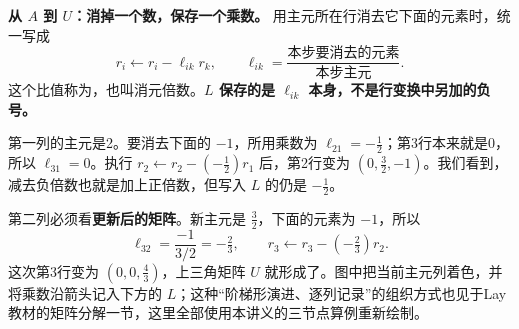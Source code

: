 \documentclass[a4paper,12pt,twoside,openany,fontset=none]{ctexbook}
\numberwithin{equation}{chapter}
\begin{document}
\par\medskip\noindent\textbf{从 $A$ 到 $U$：消掉一个数，保存一个乘数。}
用主元所在行消去它下面的元素时，统一写成
\[
 r_i\leftarrow r_i-\ell_{ik}r_k,\qquad
 \ell_{ik}=\frac{\text{本步要消去的元素}}{\text{本步主元}}.
\]
这个比值称为，也叫消元倍数。\textbf{$L$ 保存的是 $\ell_{ik}$ 本身，不是行变换中另加的负号。}

第一列的主元是2。要消去下面的 $-1$，所用乘数为 $\ell_{21}=\boxed{-\tfrac12}$；第3行本来就是0，所以 $\ell_{31}=\boxed{0}$。执行 $r_2\leftarrow r_2-(-\tfrac12)r_1$ 后，第2行变为 $(0,\tfrac32,-1)$。我们看到，减去负倍数也就是加上正倍数，但写入 $L$ 的仍是 $-\tfrac12$。

第二列必须看\textbf{更新后的矩阵}。新主元是 $\tfrac32$，下面的元素为 $-1$，所以
\[
 \ell_{32}=\frac{-1}{3/2}=\boxed{-\tfrac23},\qquad
 r_3\leftarrow r_3-(-\tfrac23)r_2.
\]
这次第3行变为 $(0,0,\tfrac43)$，上三角矩阵 $U$ 就形成了。图中把当前主元列着色，并将乘数沿箭头记入下方的 $L$；这种“阶梯形演进、逐列记录”的组织方式也见于Lay教材的矩阵分解一节\cite{lay2021}，这里全部使用本讲义的三节点算例重新绘制。
\end{document}
